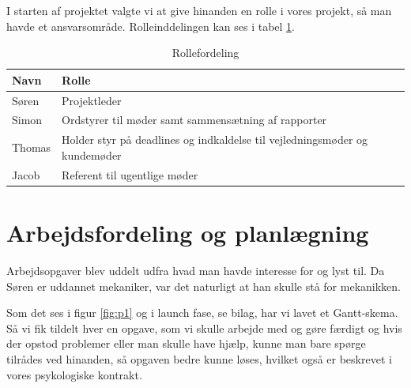 I starten af projektet valgte vi at give hinanden en rolle i vores projekt, så man havde et ansvarsområde. Rolleinddelingen kan ses i tabel \ref{tab:rolle}.
\begin{table}[h]
  \centering
\begin{tabular}{ll}
\textbf{Navn} & \textbf{Rolle} \\
\hline
Søren & Projektleder \\
Simon & Ordstyrer til møder samt sammensætning af rapporter \\
Thomas & Holder styr på deadlines og indkaldelse til vejledningsmøder og kundemøder \\
Jacob & Referent til ugentlige møder \\
\end{tabular}
  \caption{Rollefordeling}
  \label{tab:rolle}
\end{table}

\section{Arbejdsfordeling og planlægning}
\label{sec:arbejdsfordeling:-}

Arbejdsopgaver blev uddelt udfra hvad man havde interesse for og lyst til. Da Søren er uddannet mekaniker, var det naturligt at han skulle stå for mekanikken. 



Som det ses i figur \ref{fig:p1} og i launch fase, se bilag, har vi lavet et Gantt-skema. Så vi fik tildelt hver en opgave, som vi skulle arbejde med og gøre færdigt og hvis der opstod problemer eller man skulle have hjælp, kunne man bare spørge tilrådes ved hinanden, så opgaven bedre kunne løses, hvilket også er beskrevet i vores psykologiske kontrakt.

